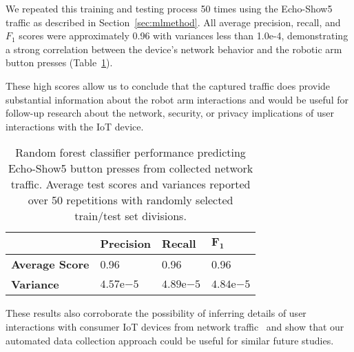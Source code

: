 We repeated this training and testing process 50 times using the Echo-Show5 traffic as described in Section~\ref{sec:mlmethod}.  All average precision,  recall, and $F_1$ scores were approximately 0.96 with variances less than 1.0e-4, demonstrating a strong correlation between the device's network behavior and the robotic arm button presses (Table~\ref{tab:scores}). 

These high scores allow us to conclude that the captured traffic does provide substantial information about the robot arm interactions and would be useful for follow-up research about the network, security, or privacy implications of user interactions with the IoT device.


\begin{table}[t]
\centering
\begin{tabular}{llll}
\toprule
& \textbf{Precision}   & \textbf{Recall}  & $\mathbf{F_1}$       \\ \midrule
\textbf{Average Score} & 0.96 & 0.96 & 0.96 \\
\textbf{Variance} & $4.57\mathrm{e}{-5}$ & $4.89\mathrm{e}{-5}$ & $4.84\mathrm{e}{-5}$ \\
\bottomrule
\end{tabular}
\caption{Random forest classifier performance predicting Echo-Show5 button presses from collected network traffic. Average test scores and variances reported over 50 repetitions with randomly selected train/test set divisions.}
\label{tab:scores}
\end{table}      

These results also corroborate the possibility of inferring details of user interactions with consumer IoT devices from network traffic~\cite{apthorpe2019keeping, acar2020peek, trimananda2020packet} and show that our automated data collection approach could be useful for similar future studies. 